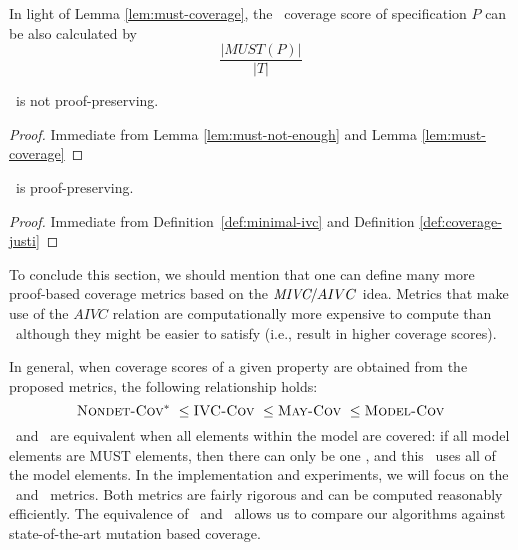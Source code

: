 In light of Lemma \ref{lem:must-coverage}, the \nondetcovalt\ coverage score of specification $P$ can be also calculated by
$$\frac{|MUST(P)|}{|T|}$$


%
\begin{coroll}
\label{cor:must-not-provable}
\nondetcovalt\ is not proof-preserving.
\end{coroll}
\begin{proof}
Immediate from Lemma \ref{lem:must-not-enough} and Lemma \ref{lem:must-coverage}
\end{proof}
\vspace{2mm}
\begin{coroll}
\label{cor:ivc-provable}
\ivccov\ is proof-preserving.
\end{coroll}
\begin{proof}
Immediate from Definition~\ref{def:minimal-ivc} and Definition \ref{def:coverage-justi}
\end{proof}
\vspace{2mm}


To conclude this section, we should mention that one can define many more proof-based coverage metrics based on the $\textit{MIVC} /AIVC$ idea. Metrics that make use of the $AIVC$ relation are computationally more expensive to compute than \ivccov\ although they might be easier to satisfy (i.e., result in higher coverage scores).

In general, when coverage scores of a given property are obtained from the proposed metrics, the following relationship holds:
$$\text{\sc Nondet-Cov$^{*}$}\ \leq \text{\sc IVC-Cov}\ \leq \text{\sc May-Cov}\ \leq \text{\sc Model-Cov}$$
\ivccov\ and \nondetcovalt\ are equivalent when all elements within the model are covered: if all model elements are MUST elements, then there can only be one \mivc , and this \mivc ~uses all of the model elements.   In the implementation and experiments, we will focus on the \ivccov\ and \nondetcovalt\ metrics.  Both metrics are fairly rigorous and can be computed reasonably efficiently.  The equivalence of \mustcov\ and \nondetcovalt\ allows us to compare our algorithms against state-of-the-art mutation based coverage.


